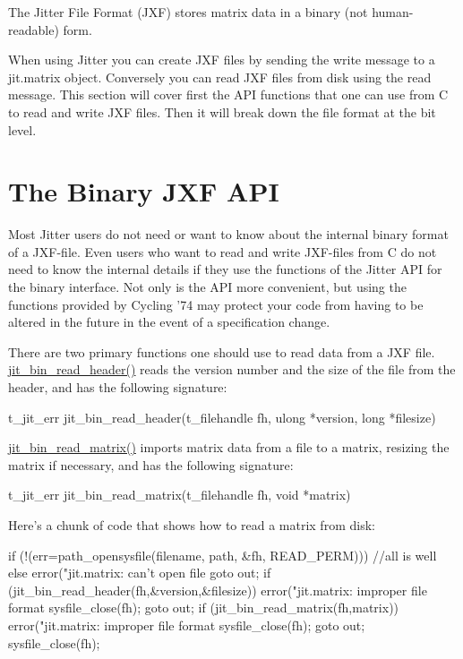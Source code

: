 The Jitter File Format (JXF) stores matrix data in a binary (not human-\/readable) form.

When using Jitter you can create JXF files by sending the write message to a jit.matrix object. Conversely you can read JXF files from disk using the read message. This section will cover first the API functions that one can use from C to read and write JXF files. Then it will break down the file format at the bit level.\hypertarget{chapter_jit_jxf_chapter_jit_jxf_api}{}\section{The Binary JXF API}\label{chapter_jit_jxf_chapter_jit_jxf_api}
Most Jitter users do not need or want to know about the internal binary format of a JXF-\/file. Even users who want to read and write JXF-\/files from C do not need to know the internal details if they use the functions of the Jitter API for the binary interface. Not only is the API more convenient, but using the functions provided by Cycling '74 may protect your code from having to be altered in the future in the event of a specification change.

There are two primary functions one should use to read data from a JXF file. \hyperlink{group__binmod_gae7d8bcde80fd16666ab01a841f0f23b2}{jit\_\-bin\_\-read\_\-header()} reads the version number and the size of the file from the header, and has the following signature:


\begin{DoxyCode}
t_jit_err jit_bin_read_header(t_filehandle fh, ulong *version, long *filesize)
\end{DoxyCode}


\hyperlink{group__binmod_gae1bd457360f302d87be427c0bcf76b9d}{jit\_\-bin\_\-read\_\-matrix()} imports matrix data from a file to a matrix, resizing the matrix if necessary, and has the following signature:


\begin{DoxyCode}
t_jit_err jit_bin_read_matrix(t_filehandle fh, void *matrix)
\end{DoxyCode}


Here’s a chunk of code that shows how to read a matrix from disk:


\begin{DoxyCode}
if (!(err=path_opensysfile(filename, path, &fh, READ_PERM))) {
   //all is well
} else {
   error("jit.matrix: can't open file %
   goto out;
}
if (jit_bin_read_header(fh,&version,&filesize)) {
   error("jit.matrix: improper file format %
   sysfile_close(fh);
   goto out;
}
if (jit_bin_read_matrix(fh,matrix)) {
   error("jit.matrix: improper file format %
   sysfile_close(fh);
   goto out;
}
sysfile_close(fh);
\end{DoxyCode}


